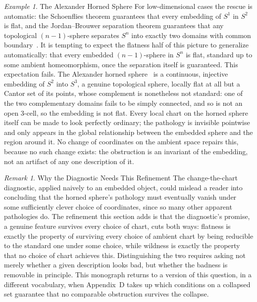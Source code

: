 \documentclass[11pt,fleqn]{book}
\numberwithin{equation}{chapter}
\theoremstyle{plain}
\theoremstyle{definition}
\theoremstyle{remark}
\newtheorem{remark}[theorem]{Remark}
\newtheorem{example}[theorem]{Example}
\begin{document}
\begin{example}{The Alexander Horned Sphere}
For low-dimensional cases the rescue is automatic: the Schoenflies theorem guarantees that every embedding of \(S^1\) in \(S^2\) is flat, and the Jordan--Brouwer separation theorem guarantees that any topological \((n-1)\)-sphere separates \(S^n\) into exactly two domains with common boundary~\cite{davermanvenema2009}. It is tempting to expect the flatness half of this picture to generalize automatically: that every embedded \((n-1)\)-sphere in \(S^n\) is flat, standard up to some ambient homeomorphism, once the separation itself is guaranteed. This expectation fails. The Alexander horned sphere~\cite{alexander1924} is a continuous, injective embedding of \(S^2\) into \(S^3\), a genuine topological sphere, locally flat at all but a Cantor set of its points, whose complement is nonetheless not standard: one of the two complementary domains fails to be simply connected, and so is not an open \(3\)-cell, so the embedding is not flat. Every local chart on the horned sphere itself can be made to look perfectly ordinary; the pathology is invisible pointwise and only appears in the global relationship between the embedded sphere and the region around it. No change of coordinates on the ambient space repairs this, because no such change exists: the obstruction is an invariant of the embedding, not an artifact of any one description of it.
\end{example}

\begin{remark}{Why the Diagnostic Needs This Refinement}
The change-the-chart diagnostic, applied naively to an embedded object, could mislead a reader into concluding that the horned sphere's pathology must eventually vanish under some sufficiently clever choice of coordinates, since so many other apparent pathologies do. The refinement this section adds is that the diagnostic's promise, a genuine feature survives every choice of chart, cuts both ways: flatness is exactly the property of surviving every choice of ambient chart by being reducible to the standard one under some choice, while wildness is exactly the property that no choice of chart achieves this. Distinguishing the two requires asking not merely whether a given description looks bad, but whether the badness is removable in principle. This monograph returns to a version of this question, in a different vocabulary, when Appendix~D takes up which conditions on a collapsed set guarantee that no comparable obstruction survives the collapse.
\end{remark}
\end{document}
